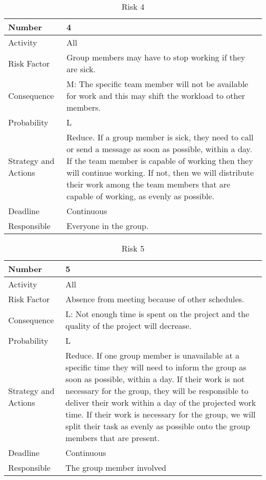 \documentclass[../document.tex]{subfiles}
\begin{document}
\begin{table}[H]
\caption{Risk 4}
\begin{tabularx}{\textwidth}{|l|X|}
\hline
Number
&4
\\ \hline Activity
&All
\\ \hline Risk Factor
&Group members may have to stop working if they are sick.
\\ \hline Consequence
&M: The specific team member will not be available for work and this may shift the workload to other members.
\\ \hline Probability
&L
\\ \hline Strategy and Actions
&Reduce. If a group member is sick, they need to call or send a message as soon as possible, within a day. If the team member is capable of working then they will continue working. If not, then we will distribute their work among the team members that are capable of working, as evenly as possible.
\\ \hline Deadline
&Continuous
\\ \hline Responsible
&Everyone in the group.
\\ \hline 
\end{tabularx}
\end{table}


\begin{table}[H]
\caption{Risk 5}
\begin{tabularx}{\textwidth}{|l|X|}
\hline
Number
&5
\\ \hline Activity
&All
\\ \hline Risk Factor
&Absence from meeting because of other schedules.
\\ \hline Consequence
&L: Not enough time is spent on the project and the quality of the project will decrease.
\\ \hline Probability
&L
\\ \hline Strategy and Actions
&Reduce. If one group member is unavailable at a specific time they will need to inform the group as soon as possible, within a day. If their work is not necessary for the group, they will be responsible to deliver their work within a day of the projected work time. If their work is necessary for the group, we will split their task as evenly as possible onto the group members that are present.
\\ \hline Deadline
&Continuous
\\ \hline Responsible
&The group member involved
\\ \hline
\end{tabularx}
\end{table}
\end{document}

